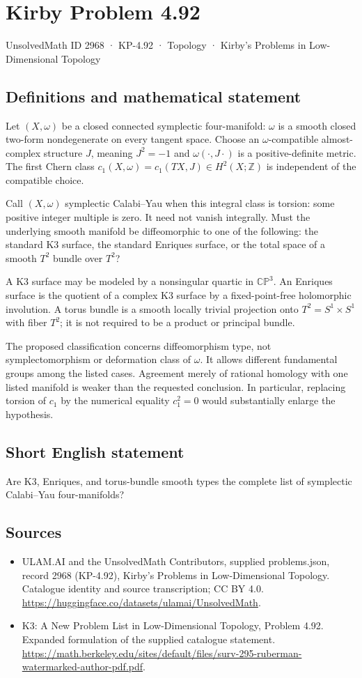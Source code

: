 \documentclass[11pt,a4paper]{article}
\begin{document}
\section*{Kirby Problem 4.92}\label{2968}
{\small UnsolvedMath ID 2968 · KP-4.92 · Topology · Kirby's Problems in Low-Dimensional Topology}
\subsection{Definitions and mathematical statement}
Let $(X,\omega)$ be a closed connected symplectic four-manifold: $\omega$ is a smooth closed two-form nondegenerate on every tangent space. Choose an $\omega$-compatible almost-complex structure $J$, meaning $J^2=-1$ and $\omega(\cdot,J\cdot)$ is a positive-definite metric. The first Chern class $c_1(X,\omega)=c_1(TX,J)\in H^2(X;\mathbb Z)$ is independent of the compatible choice.

Call $(X,\omega)$ symplectic Calabi--Yau when this integral class is torsion: some positive integer multiple is zero. It need not vanish integrally. Must the underlying smooth manifold be diffeomorphic to one of the following: the standard K3 surface, the standard Enriques surface, or the total space of a smooth $T^2$ bundle over $T^2$?

A K3 surface may be modeled by a nonsingular quartic in $\mathbb{CP}^3$. An Enriques surface is the quotient of a complex K3 surface by a fixed-point-free holomorphic involution. A torus bundle is a smooth locally trivial projection onto $T^2=S^1\times S^1$ with fiber $T^2$; it is not required to be a product or principal bundle.

The proposed classification concerns diffeomorphism type, not symplectomorphism or deformation class of $\omega$. It allows different fundamental groups among the listed cases. Agreement merely of rational homology with one listed manifold is weaker than the requested conclusion. In particular, replacing torsion of $c_1$ by the numerical equality $c_1^2=0$ would substantially enlarge the hypothesis.
\subsection{Short English statement}
Are K3, Enriques, and torus-bundle smooth types the complete list of symplectic Calabi–Yau four-manifolds?
\subsection{Sources}
\begin{itemize}
\item[S1] ULAM.AI and the UnsolvedMath Contributors, supplied problems.json, record 2968 (KP-4.92), Kirby's Problems in Low-Dimensional Topology. Catalogue identity and source transcription; CC BY 4.0.
\url{https://huggingface.co/datasets/ulamai/UnsolvedMath}.
\item[S2] K3: A New Problem List in Low-Dimensional Topology, Problem 4.92. Expanded formulation of the supplied catalogue statement.
\url{https://math.berkeley.edu/sites/default/files/surv-295-ruberman-watermarked-author-pdf.pdf}.
\end{itemize}
\end{document}

